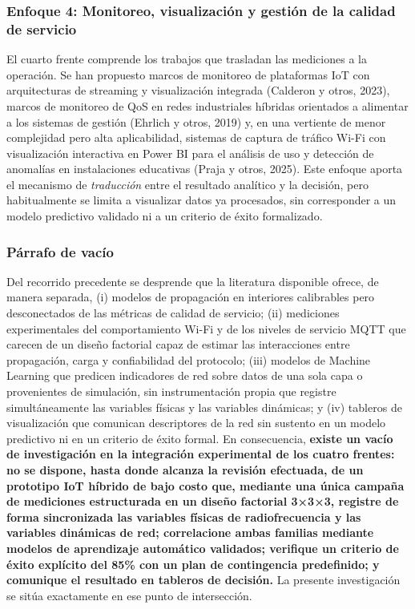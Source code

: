 \documentclass[
  12pt,
]{article}
\begin{document}
\subsubsection{Enfoque 4: Monitoreo, visualización y gestión de la
calidad de
servicio}\label{enfoque-4-monitoreo-visualizaciuxf3n-y-gestiuxf3n-de-la-calidad-de-servicio}

El cuarto frente comprende los trabajos que trasladan las mediciones a
la operación. Se han propuesto marcos de monitoreo de plataformas IoT
con arquitecturas de streaming y visualización integrada (Calderon y
otros, 2023), marcos de monitoreo de QoS en redes industriales híbridas
orientados a alimentar a los sistemas de gestión (Ehrlich y otros, 2019)
y, en una vertiente de menor complejidad pero alta aplicabilidad,
sistemas de captura de tráfico Wi-Fi con visualización interactiva en
Power BI para el análisis de uso y detección de anomalías en
instalaciones educativas (Praja y otros, 2025). Este enfoque aporta el
mecanismo de \emph{traducción} entre el resultado analítico y la
decisión, pero habitualmente se limita a visualizar datos ya procesados,
sin corresponder a un modelo predictivo validado ni a un criterio de
éxito formalizado.

\subsubsection{Párrafo de vacío}\label{puxe1rrafo-de-vacuxedo}

Del recorrido precedente se desprende que la literatura disponible
ofrece, de manera separada, (i) modelos de propagación en interiores
calibrables pero desconectados de las métricas de calidad de servicio;
(ii) mediciones experimentales del comportamiento Wi-Fi y de los niveles
de servicio MQTT que carecen de un diseño factorial capaz de estimar las
interacciones entre propagación, carga y confiabilidad del protocolo;
(iii) modelos de Machine Learning que predicen indicadores de red sobre
datos de una sola capa o provenientes de simulación, sin instrumentación
propia que registre simultáneamente las variables físicas y las
variables dinámicas; y (iv) tableros de visualización que comunican
descriptores de la red sin sustento en un modelo predictivo ni en un
criterio de éxito formal. En consecuencia, \textbf{existe un vacío de
investigación en la integración experimental de los cuatro frentes: no
se dispone, hasta donde alcanza la revisión efectuada, de un prototipo
IoT híbrido de bajo costo que, mediante una única campaña de mediciones
estructurada en un diseño factorial 3×3×3, registre de forma
sincronizada las variables físicas de radiofrecuencia y las variables
dinámicas de red; correlacione ambas familias mediante modelos de
aprendizaje automático validados; verifique un criterio de éxito
explícito del 85\% con un plan de contingencia predefinido; y comunique
el resultado en tableros de decisión.} La presente investigación se
sitúa exactamente en ese punto de intersección.
\end{document}
